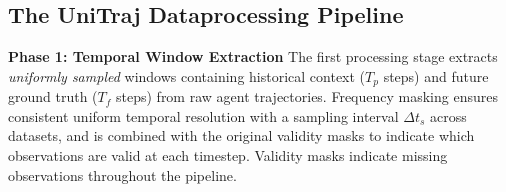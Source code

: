 



\subsection{The UniTraj Dataprocessing Pipeline}
\label{app:framework}

\textbf{Phase 1: Temporal Window Extraction}
The first processing stage extracts \emph{uniformly sampled} windows containing historical context (\(T_p\) steps) and future ground truth (\(T_f\) steps) from raw agent trajectories. Frequency masking ensures consistent uniform temporal resolution with a sampling interval \(\Delta t_{s}\) across datasets, and is combined with the original validity masks to indicate which observations are valid at each timestep. Validity masks indicate missing observations throughout the pipeline.

